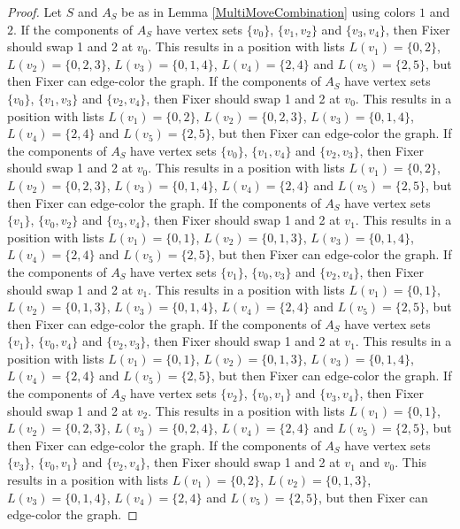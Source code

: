\documentclass[12pt]{amsart}
\theoremstyle{plain}
\theoremstyle{definition}
\theoremstyle{remark}
\begin{document}
\begin{proof}
Let $S$ and $A_S$ be as in Lemma \ref{MultiMoveCombination} using colors $1$ and $2$. If the components of $A_S$ have vertex sets $\{v_0\}$, $\{v_1, v_2\}$ and $\{v_3, v_4\}$, then Fixer should swap 1 and 2 at $v_0$. This results in a position with lists $L(v_1) = \{0, 2\}$, $L(v_2) = \{0, 2, 3\}$, $L(v_3) = \{0, 1, 4\}$, $L(v_4) = \{2, 4\}$ and $L(v_5) = \{2, 5\}$, but then Fixer can edge-color the graph.
If the components of $A_S$ have vertex sets $\{v_0\}$, $\{v_1, v_3\}$ and $\{v_2, v_4\}$, then Fixer should swap 1 and 2 at $v_0$. This results in a position with lists $L(v_1) = \{0, 2\}$, $L(v_2) = \{0, 2, 3\}$, $L(v_3) = \{0, 1, 4\}$, $L(v_4) = \{2, 4\}$ and $L(v_5) = \{2, 5\}$, but then Fixer can edge-color the graph.
If the components of $A_S$ have vertex sets $\{v_0\}$, $\{v_1, v_4\}$ and $\{v_2, v_3\}$, then Fixer should swap 1 and 2 at $v_0$. This results in a position with lists $L(v_1) = \{0, 2\}$, $L(v_2) = \{0, 2, 3\}$, $L(v_3) = \{0, 1, 4\}$, $L(v_4) = \{2, 4\}$ and $L(v_5) = \{2, 5\}$, but then Fixer can edge-color the graph.
If the components of $A_S$ have vertex sets $\{v_1\}$, $\{v_0, v_2\}$ and $\{v_3, v_4\}$, then Fixer should swap 1 and 2 at $v_1$. This results in a position with lists $L(v_1) = \{0, 1\}$, $L(v_2) = \{0, 1, 3\}$, $L(v_3) = \{0, 1, 4\}$, $L(v_4) = \{2, 4\}$ and $L(v_5) = \{2, 5\}$, but then Fixer can edge-color the graph.
If the components of $A_S$ have vertex sets $\{v_1\}$, $\{v_0, v_3\}$ and $\{v_2, v_4\}$, then Fixer should swap 1 and 2 at $v_1$. This results in a position with lists $L(v_1) = \{0, 1\}$, $L(v_2) = \{0, 1, 3\}$, $L(v_3) = \{0, 1, 4\}$, $L(v_4) = \{2, 4\}$ and $L(v_5) = \{2, 5\}$, but then Fixer can edge-color the graph.
If the components of $A_S$ have vertex sets $\{v_1\}$, $\{v_0, v_4\}$ and $\{v_2, v_3\}$, then Fixer should swap 1 and 2 at $v_1$. This results in a position with lists $L(v_1) = \{0, 1\}$, $L(v_2) = \{0, 1, 3\}$, $L(v_3) = \{0, 1, 4\}$, $L(v_4) = \{2, 4\}$ and $L(v_5) = \{2, 5\}$, but then Fixer can edge-color the graph.
If the components of $A_S$ have vertex sets $\{v_2\}$, $\{v_0, v_1\}$ and $\{v_3, v_4\}$, then Fixer should swap 1 and 2 at $v_2$. This results in a position with lists $L(v_1) = \{0, 1\}$, $L(v_2) = \{0, 2, 3\}$, $L(v_3) = \{0, 2, 4\}$, $L(v_4) = \{2, 4\}$ and $L(v_5) = \{2, 5\}$, but then Fixer can edge-color the graph.
If the components of $A_S$ have vertex sets $\{v_3\}$, $\{v_0, v_1\}$ and $\{v_2, v_4\}$, then Fixer should swap 1 and 2 at $v_1$ and $v_0$. This results in a position with lists $L(v_1) = \{0, 2\}$, $L(v_2) = \{0, 1, 3\}$, $L(v_3) = \{0, 1, 4\}$, $L(v_4) = \{2, 4\}$ and $L(v_5) = \{2, 5\}$, but then Fixer can edge-color the graph.

\end{proof}
\end{document}
